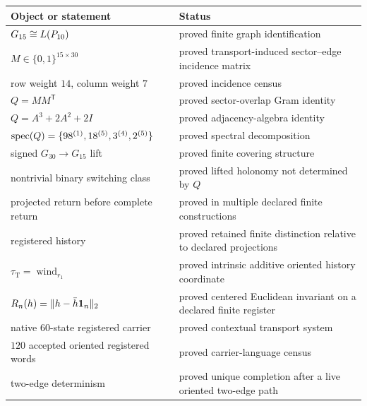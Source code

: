 \begin{center}
\begin{tabular}{p{} p{}}
\toprule
Object or statement & Status\\
\midrule

\(G_{15}\cong L(P_{10})\) &
proved finite graph identification\\

\(M\in\{0,1\}^{15\times30}\) &
proved transport-induced sector--edge incidence matrix\\

row weight \(14\), column weight \(7\) &
proved incidence census\\

\(Q=MM^{\mathsf T}\) &
proved sector-overlap Gram identity\\

\(Q=A^3+2A^2+2I\) &
proved adjacency-algebra identity\\

\(\operatorname{spec}(Q)=
\{98^{(1)},18^{(5)},3^{(4)},2^{(5)}\}\) &
proved spectral decomposition\\

signed \(G_{30}\to G_{15}\) lift &
proved finite covering structure\\

nontrivial binary switching class &
proved lifted holonomy not determined by \(Q\)\\

projected return before complete return &
proved in multiple declared finite constructions\\

registered history &
proved retained finite distinction relative to declared projections\\

\(\tau_{\mathrm T}=\operatorname{wind}_{r_1}\) &
proved intrinsic additive oriented history coordinate\\

\(R_n(h)=\|h-\bar h\mathbf{1}_n\|_2\) &
proved centered Euclidean invariant on a declared finite register\\

native \(60\)-state registered carrier &
proved contextual transport system\\

\(120\) accepted oriented registered words &
proved carrier-language census\\

two-edge determinism &
proved unique completion after a live oriented two-edge path\\

\bottomrule
\end{tabular}
\end{center}

